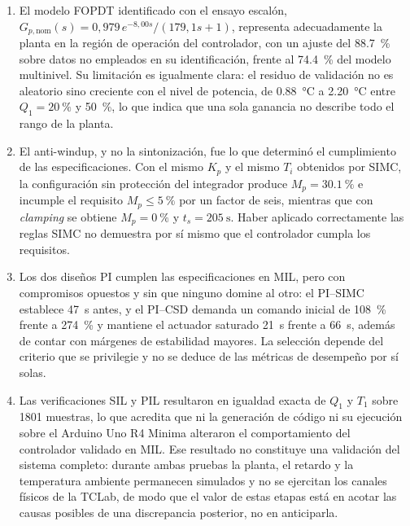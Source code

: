 \documentclass[conference,a4paper,10pt]{IEEEtran}
\newcommand{\Gpnom}{G_{p,\mathrm{nom}}}
\newcommand{\Kp}{K_p}
\newcommand{\Ti}{T_i}
\begin{document}
\begin{enumerate}[leftmargin=*]

\item El modelo FOPDT identificado con el ensayo escalón,
$\Gpnom(s) = 0{,}979\,e^{-8{,}00 s}/(179{,}1 s + 1)$, representa adecuadamente la planta en la
región de operación del controlador, con un ajuste del \SI{88.7}{\percent} sobre datos no empleados
en su identificación, frente al \SI{74.4}{\percent} del modelo multinivel. Su limitación es
igualmente clara: el residuo de validación no es aleatorio sino creciente con el nivel de potencia,
de \SI{+0.88}{\celsius} a \SI{+2.20}{\celsius} entre $Q_1 = \SI{20}{\percent}$ y
\SI{50}{\percent}, lo que indica que una sola ganancia no describe todo el rango de la planta.

\item El anti-windup, y no la sintonización, fue lo que determinó el cumplimiento de las
especificaciones. Con el mismo $\Kp$ y el mismo $\Ti$ obtenidos por SIMC, la configuración sin
protección del integrador produce $M_p = \SI{30.1}{\percent}$ e incumple el requisito
$M_p \leq \SI{5}{\percent}$ por un factor de seis, mientras que con \emph{clamping} se obtiene
$M_p = \SI{0}{\percent}$ y $t_s = \SI{205}{\second}$. Haber aplicado correctamente las reglas SIMC
no demuestra por sí mismo que el controlador cumpla los requisitos.

\item Los dos diseños PI cumplen las especificaciones en MIL, pero con compromisos opuestos y sin
que ninguno domine al otro: el PI--SIMC establece \SI{47}{\second} antes, y el PI--CSD demanda un
comando inicial de \SI{108}{\percent} frente a \SI{274}{\percent} y mantiene el actuador saturado
\SI{21}{\second} frente a \SI{66}{\second}, además de contar con márgenes de estabilidad mayores.
La selección depende del criterio que se privilegie y no se deduce de las métricas de desempeño por
sí solas.

\item Las verificaciones SIL y PIL resultaron en igualdad exacta de $Q_1$ y $T_1$ sobre
\num{1801} muestras, lo que acredita que ni la generación de código ni su ejecución sobre el
Arduino Uno R4 Minima alteraron el comportamiento del controlador validado en MIL. Ese resultado no
constituye una validación del sistema completo: durante ambas pruebas la planta, el retardo y la
temperatura ambiente permanecen simulados y no se ejercitan los canales físicos de la TCLab, de
modo que el valor de estas etapas está en acotar las causas posibles de una discrepancia
posterior, no en anticiparla.


\end{enumerate}
\end{document}
